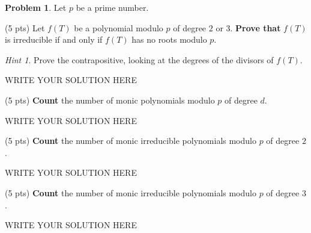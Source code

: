 \documentclass[11pt]{article}
\theoremstyle{plain}
\theoremstyle{definition}
\newtheorem{problem}{Problem}
\theoremstyle{remark}
\newtheorem*{hint}{Hint}
\numberwithin{equation}{problem}
\begin{document}
\begin{problem}
	Let $p$ be a prime number. 
	\begin{listinprob}
		\item (5 pts) Let $f(T)$ be a polynomial modulo $p$ of degree $2$ or $3$. \textbf{Prove that} $f(T)$ is irreducible if and only if $f(T)$ has no roots modulo $p$.
		\begin{hint}
			Prove the contrapositive, looking at the degrees of the divisors of $f(T)$.
		\end{hint}
\begin{solution} %
WRITE YOUR SOLUTION HERE
\end{solution}\clearpage %

		\item (5 pts) \textbf{Count} the number of monic polynomials modulo $p$ of degree $d$.
\begin{solution} %
WRITE YOUR SOLUTION HERE
\end{solution}\clearpage %

		\item (5 pts) \textbf{Count} the number of monic irreducible polynomials modulo $p$ of degree $2$.
\begin{solution} %
WRITE YOUR SOLUTION HERE
\end{solution}\clearpage %

		\item (5 pts) \textbf{Count} the number of monic irreducible polynomials modulo $p$ of degree $3$.
	\end{listinprob}	
\end{problem}
\begin{solution} %
WRITE YOUR SOLUTION HERE
\end{solution}\clearpage %
\end{document}
